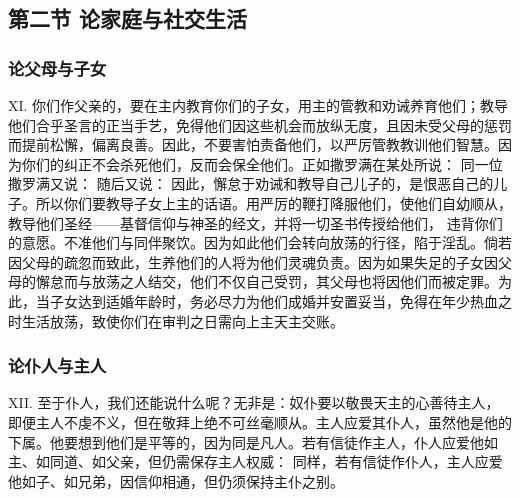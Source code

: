 
\subsection{第二节 论家庭与社交生活}


\subsubsection{论父母与子女}

XI. 你们作父亲的，要在主内教育你们的子女，用主的管教和劝诫养育他们；教导他们合乎圣言的正当手艺，免得他们因这些机会而放纵无度，且因未受父母的惩罚而提前松懈，偏离良善。因此，不要害怕责备他们，以严厉管教教训他们智慧。因为你们的纠正不会杀死他们，反而会保全他们。正如撒罗满在某处所说： 同一位撒罗满又说： 随后又说： 因此，懈怠于劝诫和教导自己儿子的，是恨恶自己的儿子。所以你们要教导子女上主的话语。用严厉的鞭打降服他们，使他们自幼顺从，教导他们圣经——基督信仰与神圣的经文，并将一切圣书传授给他们， 违背你们的意愿。不准他们与同伴聚饮。因为如此他们会转向放荡的行径，陷于淫乱。倘若因父母的疏忽而致此，生养他们的人将为他们灵魂负责。因为如果失足的子女因父母的懈怠而与放荡之人结交，他们不仅自己受罚，其父母也将因他们而被定罪。为此，当子女达到适婚年龄时，务必尽力为他们成婚并安置妥当，免得在年少热血之时生活放荡，致使你们在审判之日需向上主天主交账。\par


\subsubsection{论仆人与主人}

XII. 至于仆人，我们还能说什么呢？无非是：奴仆要以敬畏天主的心善待主人，即便主人不虔不义，但在敬拜上绝不可丝毫顺从。主人应爱其仆人，虽然他是他的下属。他要想到他们是平等的，因为同是凡人。若有信徒作主人，仆人应爱他如主、如同道、如父亲，但仍需保存主人权威： 同样，若有信徒作仆人，主人应爱他如子、如兄弟，因信仰相通，但仍须保持主仆之别。\par

